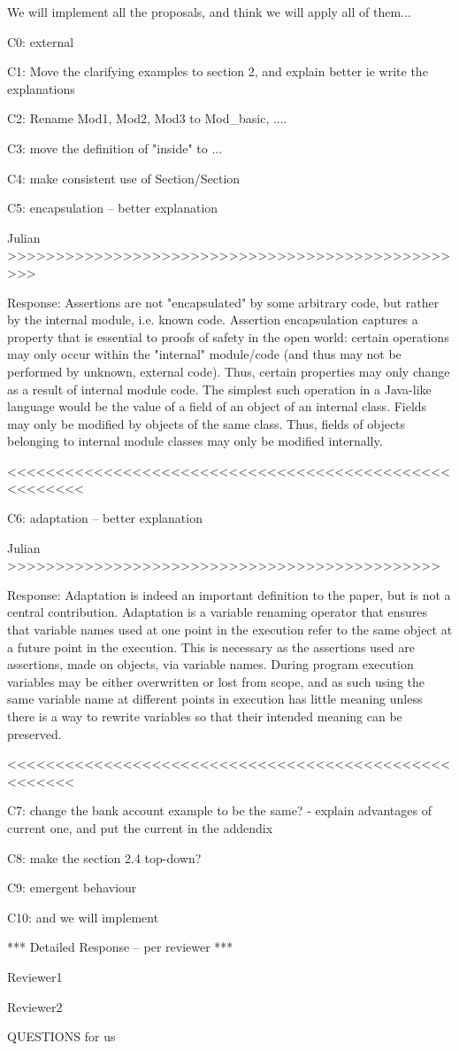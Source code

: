 We will implement all the proposals, and think we will apply all of them...

C0: external

C1: Move the clarifying examples to section 2, and explain better
ie write the explanations

C2: Rename Mod1, Mod2, Mod3 to Mod_{basic}, ....

C3: move the definition of "inside" to ...

C4: make consistent use of Section/Section

C5: encapsulation -- better explanation

Julian >>>>>>>>>>>>>>>>>>>>>>>>>>>>>>>>>>>>>>>>>>>>>>>>>

Response:
Assertions are not "encapsulated" by some arbitrary code, but rather by the internal module, i.e. known code. Assertion encapsulation captures a property that is essential to proofs of safety in the open world: certain operations may only occur within the "internal" module/code (and thus may not be performed by unknown, external code). Thus, certain properties may only change as a result of internal module code. The simplest such operation in a Java-like language would be the value of a field of an object of an internal class. Fields may only be modified by objects of the same class. Thus, fields of objects belonging to internal module classes may only be modified internally.

<<<<<<<<<<<<<<<<<<<<<<<<<<<<<<<<<<<<<<<<<<<<<<<<<<<<<<

C6: adaptation -- better explanation

Julian >>>>>>>>>>>>>>>>>>>>>>>>>>>>>>>>>>>>>>>>>>>>>

Response:
Adaptation is indeed an important definition to the paper, but is not a central contribution. Adaptation is a variable renaming operator that ensures that variable names used at one point in the execution refer to the same object at a future point in the execution. This is necessary as the assertions used are assertions, made on objects, via variable names. During program execution variables may be either overwritten or lost from scope, and as such using the same variable name at different points in execution has little meaning unless there is a way to rewrite variables so that their intended meaning can be preserved. 

<<<<<<<<<<<<<<<<<<<<<<<<<<<<<<<<<<<<<<<<<<<<<<<<<<<<<

C7: change the bank account example to be the same?
- explain advantages of current one, and put the current in the addendix

C8: make the section 2.4 top-down?

C9: emergent behaviour 

C10: and we will implement
 


*** Detailed Response -- per reviewer ***

Reviewer1

Reviewer2


QUESTIONS for us